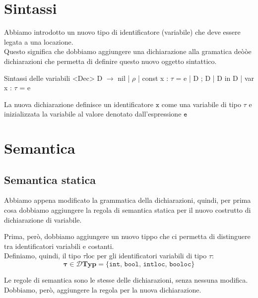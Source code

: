 \section{Sintassi}
Abbiamo introdotto un nuovo tipo di identificatore (variabile) che deve essere legata a una locazione.\\[0.2ex]
Questo significa che dobbiamo aggiungere una dichiarazione alla gramatica deòòe dichiarazioni che permetta di definire questo nuovo oggetto sintattico.

\begin{bnfcode}{Sintassi delle variabili}
    <Dec>
    D $\rightarrow$ nil | $\rho$ | const x : $\tau$ = e | D ; D | D in D |
        var x : $\tau$ = e
\end{bnfcode}

La nuova dichiarazione definisce un identificatore $\texttt{x}$ come una variabile di tipo $\tau$ e inizializzata la variabile al valore denotato dall'espressione $\texttt{e}$

\section{Semantica}

\subsection{Semantica statica}
Abbiamo appena modificato la grammatica della dichiarazioni, quindi, per prima cosa dobbiamo aggiungere la regola di semantica statica per il nuovo costrutto di dichiarazione di variabile.

\smallskip
Prima, però, dobbiamo aggiungere un nuovo tippo che ci permetta di distinguere tra identificatori variabili e costanti.\\[0.2ex]
Definiamo, quindi, il tipo $\tau \text{loc}$ per gli identificatori variabili di tipo $\tau$:
\[
    \mathbf{\tau \in \mathcal{D}\text{Typ} = \{\texttt{int, bool, intloc, booloc}\}}
\]

Le regole di semantica sono le stesse delle dichiarazioni, senza nessuna modifica.\\[0.2ex]
Dobbiamo, però, aggiungere la regola per la nuova dichiarazione.

